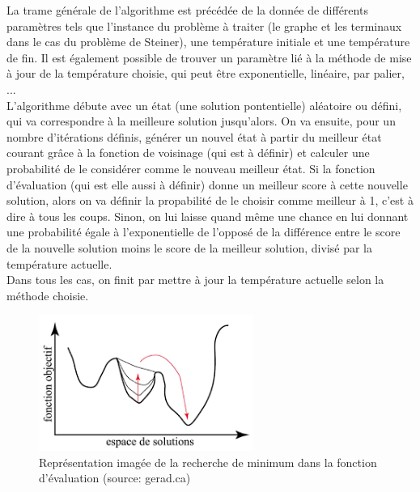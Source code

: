 \documentclass{article}
\begin{document}
La trame générale de l'algorithme est précédée de la donnée de différents paramètres tels que l'instance du problème à traiter (le graphe et les terminaux dans le cas du problème de Steiner), une température initiale et une température de fin. Il est également possible de trouver un paramètre lié à la méthode de mise à jour de la température choisie, qui peut être exponentielle, linéaire, par palier, ... \\ 
L'algorithme débute avec un état (une solution pontentielle) aléatoire ou défini, qui va correspondre à la meilleure solution jusqu'alors. On va ensuite, pour un nombre d'itérations définis, générer un nouvel état à partir du meilleur état courant grâce à la fonction de voisinage (qui est à définir) et calculer une probabilité de le considérer comme le nouveau meilleur état. Si la fonction d'évaluation (qui est elle aussi à définir) donne un meilleur score à cette nouvelle solution, alors on va définir la propabilité de le choisir comme meilleur à 1, c'est à dire à tous les coups. Sinon, on lui laisse quand même une chance en lui donnant une probabilité égale à l'exponentielle de l'opposé de la différence entre le score de la nouvelle solution moins le score de la meilleur solution, divisé par la température actuelle. \\
Dans tous les cas, on finit par mettre à jour la température actuelle selon la méthode choisie. \\ \par 

\begin{figure}[!h]
	\centerline{ \includegraphics[width=7cm]{images/recuitsimule.png}}
	\caption{Représentation imagée de la recherche de minimum dans la fonction d'évaluation (source: gerad.ca) }
\end{figure}
\end{document}
